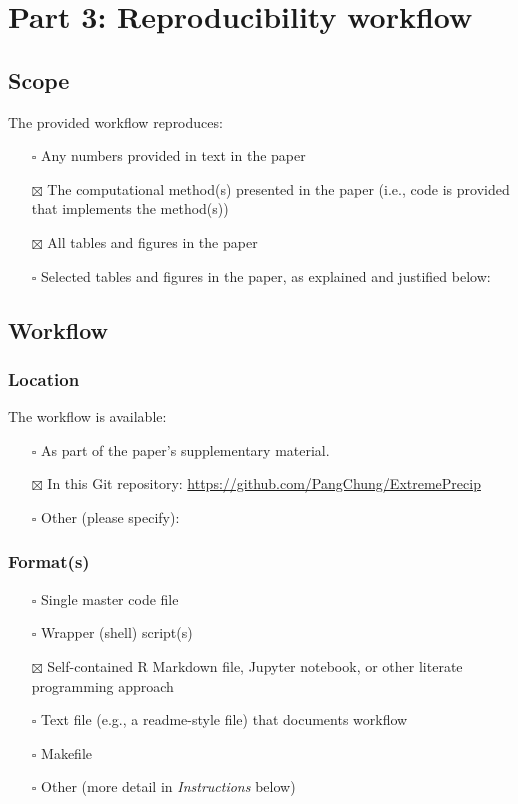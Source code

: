 \documentclass[
]{article}
\providecommand{\tightlist}{%
  \setlength{\itemsep}{0pt}\setlength{\parskip}{0pt}}
\begin{document}
\section{Part 3: Reproducibility
workflow}\label{part-3-reproducibility-workflow}

\subsection{Scope}\label{scope}

The provided workflow reproduces:

\begin{itemize}
\tightlist
\item[$\square$]
  Any numbers provided in text in the paper
\item[$\boxtimes$]
  The computational method(s) presented in the paper (i.e., code is
  provided that implements the method(s))
\item[$\boxtimes$]
  All tables and figures in the paper
\item[$\square$]
  Selected tables and figures in the paper, as explained and justified
  below:
\end{itemize}

\subsection{Workflow}\label{workflow}

\subsubsection{Location}\label{location}

The workflow is available:

\begin{itemize}
\tightlist
\item[$\square$]
  As part of the paper's supplementary material.
\item[$\boxtimes$]
  In this Git repository:
  \url{https://github.com/PangChung/ExtremePrecip}
\item[$\square$]
  Other (please specify):
\end{itemize}

\subsubsection{Format(s)}\label{formats}

\begin{itemize}
\tightlist
\item[$\square$]
  Single master code file
\item[$\square$]
  Wrapper (shell) script(s)
\item[$\boxtimes$]
  Self-contained R Markdown file, Jupyter notebook, or other literate
  programming approach
\item[$\square$]
  Text file (e.g., a readme-style file) that documents workflow
\item[$\square$]
  Makefile
\item[$\square$]
  Other (more detail in \emph{Instructions} below)
\end{itemize}
\end{document}
